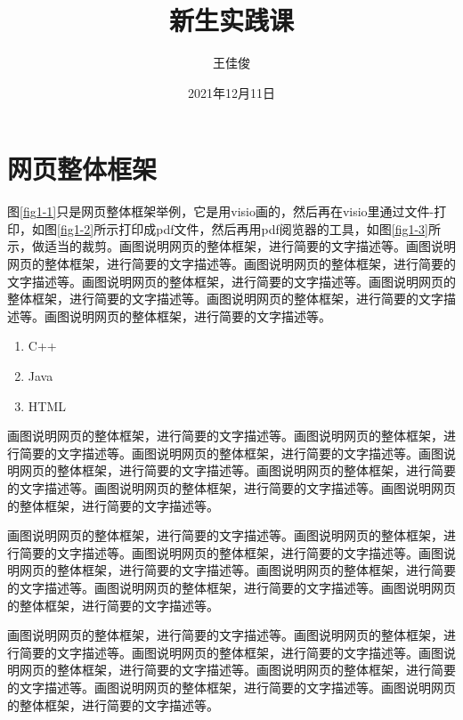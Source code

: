 \documentclass[supercite]{Experimental_Report}
\title{~~~~~~新生实践课~~~~~~}
\author{王佳俊}
\date{2021年12月11日}
\theoremstyle{definition}
\begin{document}
\maketitle

\clearpage


\tableofcontents[level=2]
\clearpage


\section{网页整体框架}

图\ref{fig1-1}只是网页整体框架举例，它是用visio画的，然后再在visio里通过文件-打印，如图\ref{fig1-2}所示打印成pdf文件，然后再用pdf阅览器的工具，如图\ref{fig1-3}所示，做适当的裁剪。画图说明网页的整体框架，进行简要的文字描述等。画图说明网页的整体框架，进行简要的文字描述等。画图说明网页的整体框架，进行简要的文字描述等。画图说明网页的整体框架，进行简要的文字描述等。画图说明网页的整体框架，进行简要的文字描述等。画图说明网页的整体框架，进行简要的文字描述等。画图说明网页的整体框架，进行简要的文字描述等。

\begin{enumerate}
\renewcommand{\labelenumi}{\theenumi)}
	\item C++
	\item Java
	\item HTML
\end{enumerate}

画图说明网页的整体框架，进行简要的文字描述等。画图说明网页的整体框架，进行简要的文字描述等。画图说明网页的整体框架，进行简要的文字描述等。画图说明网页的整体框架，进行简要的文字描述等。画图说明网页的整体框架，进行简要的文字描述等。画图说明网页的整体框架，进行简要的文字描述等。画图说明网页的整体框架，进行简要的文字描述等。

画图说明网页的整体框架，进行简要的文字描述等。画图说明网页的整体框架，进行简要的文字描述等。画图说明网页的整体框架，进行简要的文字描述等。画图说明网页的整体框架，进行简要的文字描述等。画图说明网页的整体框架，进行简要的文字描述等。画图说明网页的整体框架，进行简要的文字描述等。画图说明网页的整体框架，进行简要的文字描述等。

画图说明网页的整体框架，进行简要的文字描述等。画图说明网页的整体框架，进行简要的文字描述等。画图说明网页的整体框架，进行简要的文字描述等。画图说明网页的整体框架，进行简要的文字描述等。画图说明网页的整体框架，进行简要的文字描述等。画图说明网页的整体框架，进行简要的文字描述等。画图说明网页的整体框架，进行简要的文字描述等。
\end{document}
